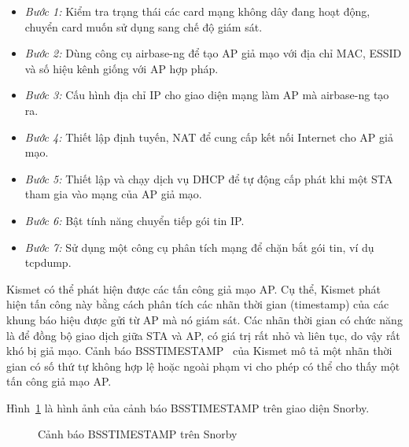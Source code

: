 \begin{itemize}
\item \emph{Bước 1:} Kiểm tra trạng thái các card mạng không dây đang hoạt động, chuyển card muốn sử dụng sang chế độ giám sát.
\item \emph{Bước 2:} Dùng công cụ airbase-ng để tạo AP giả mạo với địa chỉ MAC, ESSID và số hiệu kênh giống với AP hợp pháp.
\item \emph{Bước 3:} Cấu hình địa chỉ IP cho giao diện mạng làm AP mà airbase-ng tạo ra.
\item \emph{Bước 4:} Thiết lập định tuyến, NAT để cung cấp kết nối Internet cho AP giả mạo.
\item \emph{Bước 5:} Thiết lập và chạy dịch vụ DHCP để tự động cấp phát khi một STA tham gia vào mạng của AP giả mạo.
\item \emph{Bước 6:} Bật tính năng chuyển tiếp gói tin IP.
\item \emph{Bước 7:} Sử dụng một công cụ phân tích mạng để chặn bắt gói tin, ví dụ tcpdump.
\end{itemize}

Kismet có thể phát hiện được các tấn công giả mạo AP. Cụ thể, Kismet phát hiện tấn công này bằng cách phân tích các nhãn thời gian (timestamp) của các khung báo hiệu được gửi từ AP mà nó giám sát. Các nhãn thời gian có chức năng là để đồng bộ giao dịch giữa STA và AP, có giá trị rất nhỏ và liên tục, do vậy rất khó bị giả mạo. Cảnh báo BSSTIMESTAMP~\cite{mike2016kismet} của Kismet mô tả một nhãn thời gian có số thứ tự không hợp lệ hoặc ngoài phạm vi cho phép có thể cho thấy một tấn công giả mạo AP.

Hình~\ref{fig:bss-timestamp-snorby} là hình ảnh của cảnh báo BSSTIMESTAMP trên giao diện Snorby.

\begin{figure}[H]
    \centering
    \caption{
        \label{fig:bss-timestamp-snorby}
        Cảnh báo BSSTIMESTAMP trên Snorby}
\end{figure}

